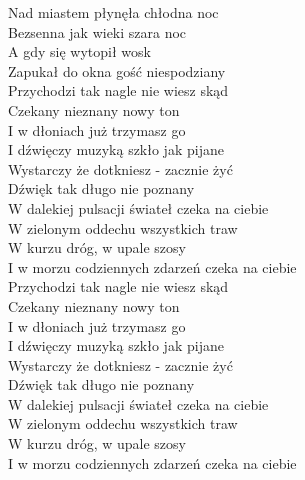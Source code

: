 
\begin{flushleft}
Nad miastem płynęła chłodna noc \\
Bezsenna jak wieki szara noc \\
A gdy się wytopił wosk \\
Zapukał do okna gość niespodziany \\
\vskip 3mm
\hspace{0.9cm}Przychodzi tak nagle nie wiesz skąd \\
\hspace{0.9cm}Czekany nieznany nowy ton \\
\hspace{0.9cm}I w dłoniach już trzymasz go \\
\hspace{0.9cm}I dźwięczy muzyką szkło jak pijane \\
\vskip 3mm
\hspace{1.8cm}Wystarczy że dotkniesz - zacznie żyć \\
\hspace{1.8cm}Dźwięk tak długo nie poznany \\
\hspace{1.8cm}W dalekiej pulsacji świateł czeka na ciebie \\
\vskip 3mm
\hspace{1.8cm}W zielonym oddechu wszystkich traw \\
\hspace{1.8cm}W kurzu dróg, w upale szosy \\
\hspace{1.8cm}I w morzu codziennych zdarzeń czeka na ciebie \\
\vskip 3mm
\hspace{0.9cm}Przychodzi tak nagle nie wiesz skąd \\
\hspace{0.9cm}Czekany nieznany nowy ton \\
\hspace{0.9cm}I w dłoniach już trzymasz go \\
\hspace{0.9cm}I dźwięczy muzyką szkło jak pijane \\
\vskip 3mm
\hspace{1.8cm}Wystarczy że dotkniesz - zacznie żyć \\
\hspace{1.8cm}Dźwięk tak długo nie poznany \\
\hspace{1.8cm}W dalekiej pulsacji świateł czeka na ciebie \\
\vskip 3mm
\hspace{1.8cm}W zielonym oddechu wszystkich traw \\
\hspace{1.8cm}W kurzu dróg, w upale szosy \\
\hspace{1.8cm}I w morzu codziennych zdarzeń czeka na ciebie \\
\end{flushleft}
\clearpage
